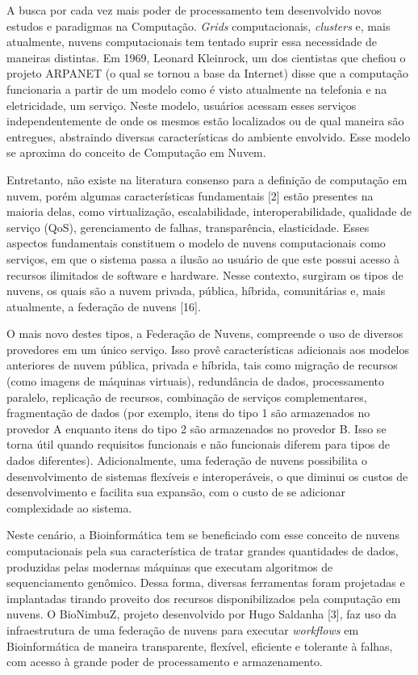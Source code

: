 A busca por cada vez mais poder de processamento tem desenvolvido novos estudos e paradigmas na Computação. \textit{Grids} computacionais, \textit{clusters} e, mais atualmente, nuvens computacionais tem tentado suprir essa necessidade de maneiras distintas. Em 1969, Leonard Kleinrock, um dos cientistas que chefiou o projeto ARPANET (o qual se tornou a base da Internet) disse que a computação funcionaria a partir de um modelo como é visto atualmente na telefonia e na eletricidade, um serviço. Neste modelo, usuários acessam esses serviços independentemente de onde os mesmos estão localizados ou de qual maneira são entregues, abstraindo diversas características do ambiente envolvido. Esse modelo se aproxima do conceito de Computação em Nuvem.

Entretanto, não existe na literatura consenso para a definição de computação em nuvem, porém algumas características fundamentais [2] estão presentes na maioria delas, como virtualização, escalabilidade, interoperabilidade, qualidade de serviço (QoS), gerenciamento de falhas, transparência, elasticidade. Esses aspectos fundamentais constituem o modelo de nuvens computacionais como serviços, em que o sistema passa a ilusão ao usuário de que este possui acesso à recursos ilimitados de software e hardware. Nesse contexto, surgiram os tipos de nuvens, os quais são a nuvem privada, pública, híbrida, comunitárias e, mais atualmente, a federação de nuvens [16]. 

O mais novo destes tipos, a Federação de Nuvens, compreende o uso de diversos provedores em um único serviço. Isso provê características adicionais aos modelos anteriores de nuvem pública, privada e híbrida, tais como migração de recursos (como imagens de máquinas virtuais), redundância de dados, processamento paralelo, replicação de recursos, combinação de serviços complementares, fragmentação de dados (por exemplo, itens do tipo 1 são armazenados no provedor A enquanto itens do tipo 2 são armazenados no provedor B. Isso se torna útil quando requisitos funcionais e não funcionais diferem para tipos de dados diferentes). Adicionalmente, uma federação de nuvens possibilita o desenvolvimento de sistemas flexíveis e interoperáveis, o que diminui os custos de desenvolvimento e facilita sua expansão, com o custo de se adicionar complexidade ao sistema.

Neste cenário, a Bioinformática tem se beneficiado com esse conceito de nuvens computacionais pela sua característica de tratar grandes quantidades de dados, produzidas pelas modernas máquinas que executam algoritmos de sequenciamento genômico. Dessa forma, diversas ferramentas foram projetadas e implantadas tirando proveito dos recursos disponibilizados pela computação em nuvens. O BioNimbuZ, projeto desenvolvido por Hugo Saldanha [3], faz uso da infraestrutura de uma federação de nuvens para executar \textit{workflows} em Bioinformática de maneira transparente, flexível, eficiente e tolerante à falhas, com acesso à grande poder de processamento e armazenamento.

